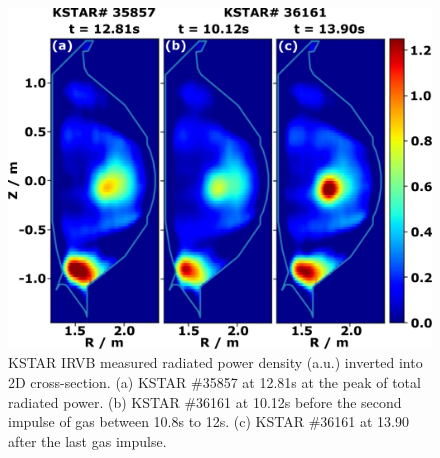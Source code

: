 \begin{figure}[!h]
 \centering
 \includegraphics[width=\linewidth]{figures/Prad_2D.pdf}
 \caption{
KSTAR \ac{IRVB} measured radiated power density (a.u.) inverted into 2D cross-section.
(a) KSTAR \#35857 at 12.81s at the peak of total radiated power.
(b) KSTAR \#36161 at 10.12s before  the second impulse of gas between 10.8s to 12s.
(c) KSTAR \#36161 at 13.90 after the last gas impulse.
}
\label{fig:prad_2d}
\end{figure}